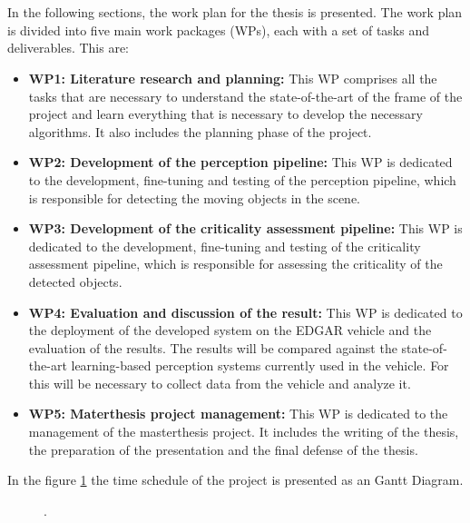 \section{}%



In the following sections, the work plan for the thesis is presented. The work plan is divided into five main
work packages (WPs), each with a set of tasks and deliverables. This are:

\begin{itemize}
  \item \textbf{WP1: Literature research and planning:} This WP comprises all the tasks
   that are necessary to understand the state-of-the-art of the frame of the project and 
   learn everything that is necessary to develop the necessary algorithms. It also includes
   the planning phase of the project.

  \item \textbf{WP2: Development of the perception pipeline:} This WP is dedicated to the development,
  fine-tuning and testing of the perception pipeline, which is responsible for detecting the moving objects in the scene.

  \item \textbf{WP3: Development of the criticality assessment pipeline:} This WP is dedicated to the development,
  fine-tuning and testing of the criticality assessment pipeline, which is responsible for assessing the criticality of the detected objects.
  \item \textbf{WP4: Evaluation and discussion of the result:} This WP is dedicated to the deployment of the developed system on the EDGAR vehicle
  and the evaluation of the results. The results will be compared against the state-of-the-art learning-based perception systems currently used in the vehicle.
  For this will be necessary to collect data from the vehicle and analyze it. 
  \item \textbf{WP5: Materthesis project management:} This WP is dedicated to the management of the masterthesis project. It includes the writing of the thesis, the preparation of the presentation and the final defense of the thesis.

\end{itemize}

In the figure \ref{fig:timeschedule} the time schedule of the project is presented as an Gantt Diagram.
\begin{figure}[htb]%
  \hspace*{-2.5cm} %
  \FTMlangGerEng{}{}%
  \caption{.}%
  \label{fig:timeschedule}%
\end{figure}%


